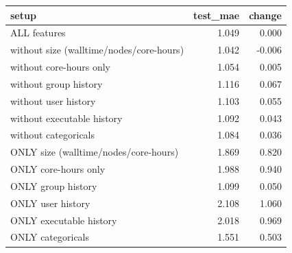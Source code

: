 \begin{tabular}{lrr}
\toprule
setup & test_mae & change \\
\midrule
ALL features & 1.049 & 0.000 \\
without size (walltime/nodes/core-hours) & 1.042 & -0.006 \\
without core-hours only & 1.054 & 0.005 \\
without group history & 1.116 & 0.067 \\
without user history & 1.103 & 0.055 \\
without executable history & 1.092 & 0.043 \\
without categoricals & 1.084 & 0.036 \\
ONLY size (walltime/nodes/core-hours) & 1.869 & 0.820 \\
ONLY core-hours only & 1.988 & 0.940 \\
ONLY group history & 1.099 & 0.050 \\
ONLY user history & 2.108 & 1.060 \\
ONLY executable history & 2.018 & 0.969 \\
ONLY categoricals & 1.551 & 0.503 \\
\bottomrule
\end{tabular}
